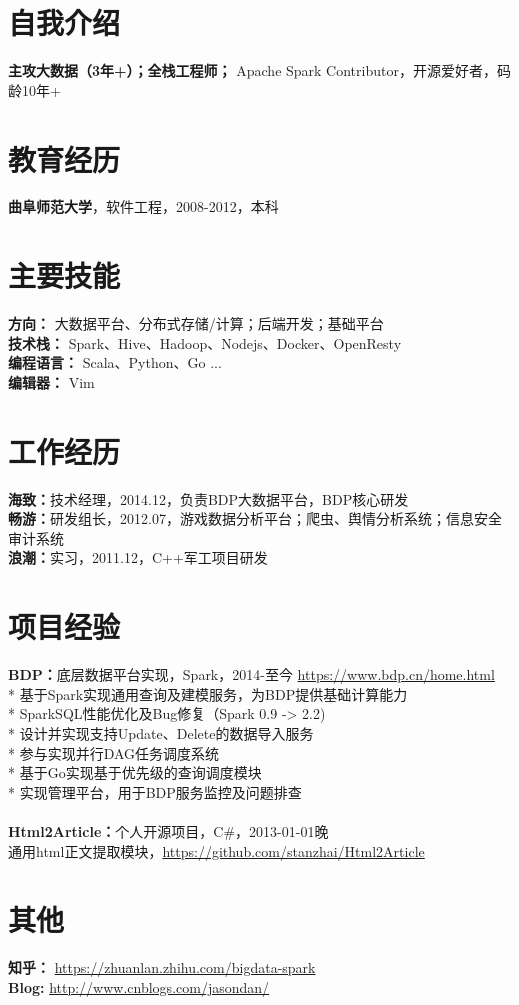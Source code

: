 \documentclass[UTF8,margin,line]{res}
\begin{document}

\begin{resume}

\section{\sc 自我介绍}
\textbf{主攻大数据（3年+）；全栈工程师；} Apache Spark Contributor，开源爱好者，码龄10年+

\section{\sc 教育经历}
\textbf{曲阜师范大学}，软件工程，2008-2012，本科

\section{\sc 主要技能}
\textbf{方向：} 大数据平台、分布式存储/计算；后端开发；基础平台 \\
\textbf{技术栈：} Spark、Hive、Hadoop、Nodejs、Docker、OpenResty \\
\textbf{编程语言：} Scala、Python、Go ... \\
\textbf{编辑器：} Vim

\section{\sc 工作经历}
\textbf{海致：}技术经理，2014.12，负责BDP大数据平台，BDP核心研发 \\
\textbf{畅游：}研发组长，2012.07，游戏数据分析平台；爬虫、舆情分析系统；信息安全审计系统 \\
\textbf{浪潮：}实习，2011.12，C++军工项目研发

\section{\sc 项目经验}
\textbf{BDP：}底层数据平台实现，Spark，2014-至今 \url{https://www.bdp.cn/home.html} \\
* 基于Spark实现通用查询及建模服务，为BDP提供基础计算能力 \\
* SparkSQL性能优化及Bug修复（Spark 0.9 -> 2.2) \\
* 设计并实现支持Update、Delete的数据导入服务 \\
* 参与实现并行DAG任务调度系统 \\
* 基于Go实现基于优先级的查询调度模块 \\
* 实现管理平台，用于BDP服务监控及问题排查 \\
\\
\textbf{Html2Article：}个人开源项目，C\#，2013-01-01晚 \\
通用html正文提取模块，\url{https://github.com/stanzhai/Html2Article} \\

\section{\sc 其他}
\textbf{知乎：} \url{https://zhuanlan.zhihu.com/bigdata-spark} \\
\textbf{Blog: } \url{http://www.cnblogs.com/jasondan/} \\

\end{resume}
\end{document}
